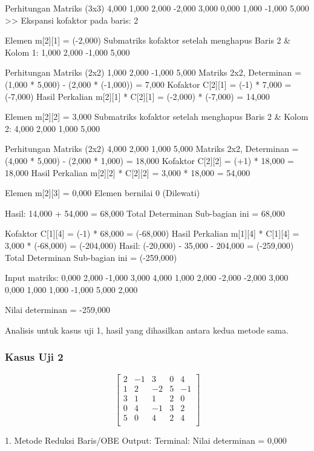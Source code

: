 \documentclass[12pt]{article}
\begin{document}
\begin{enumerate}
\begin{keluaran}
Perhitungan Matriks (3x3)
4,000 1,000 2,000 
-2,000 3,000 0,000 
1,000 -1,000 5,000 
>> Ekspansi kofaktor pada baris: 2

Elemen m[2][1] = (-2,000)
Submatriks kofaktor setelah menghapus Baris 2 & Kolom 1:
1,000 2,000 
-1,000 5,000 

Perhitungan Matriks (2x2)
1,000 2,000 
-1,000 5,000 
Matriks 2x2, Determinan = (1,000 * 5,000) - (2,000 * (-1,000)) = 7,000
Kofaktor C[2][1] = (-1) * 7,000 = (-7,000)
Hasil Perkalian m[2][1] * C[2][1] = (-2,000) * (-7,000) = 14,000

Elemen m[2][2] = 3,000
Submatriks kofaktor setelah menghapus Baris 2 & Kolom 2:
4,000 2,000 
1,000 5,000 

Perhitungan Matriks (2x2)
4,000 2,000 
1,000 5,000 
Matriks 2x2, Determinan = (4,000 * 5,000) - (2,000 * 1,000) = 18,000
Kofaktor C[2][2] = (+1) * 18,000 = 18,000
Hasil Perkalian m[2][2] * C[2][2] = 3,000 * 18,000 = 54,000

Elemen m[2][3] = 0,000
Elemen bernilai 0 (Dilewati)

Hasil: 14,000 + 54,000 = 68,000
Total Determinan Sub-bagian ini = 68,000

Kofaktor C[1][4] = (-1) * 68,000 = (-68,000)
Hasil Perkalian m[1][4] * C[1][4] = 3,000 * (-68,000) = (-204,000)
Hasil: (-20,000) - 35,000 - 204,000 = (-259,000)
Total Determinan Sub-bagian ini = (-259,000)


Input matriks:
0,000	2,000	-1,000	3,000
4,000	1,000	2,000	-2,000
-2,000	3,000	0,000	1,000
1,000	-1,000	5,000	2,000

Nilai determinan = -259,000
\end{keluaran}
Analisis untuk kasus uji 1, hasil yang dihasilkan antara kedua metode sama.
\subsubsection{Kasus Uji 2}
\begin{equation}
    \begin{bmatrix}
        2 & -1 & 3 & 0 & 4 \\
        1 & 2 & -2 & 5 & -1 \\
        3 & 1 & 1 & 2 & 0 \\
        0 & 4 & -1 & 3 & 2 \\
        5 & 0 & 4 & 2 & 4 \\
    \end{bmatrix}
\end{equation}
\begin{keluaran}
1. Metode Reduksi Baris/OBE
Output:
Terminal:
Nilai determinan = 0,000


\end{keluaran}
\end{enumerate}
\end{document}
